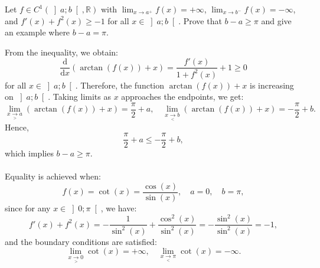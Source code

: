 \begin{problem}
    Let \( f \in C^1\left( \left]a;b\right[, \mathbb{R} \right) \) with \( \lim_{x \to a^+} f\left(x\right) = +\infty \), \( \lim_{x \to b^-} f\left(x\right) = -\infty \), and \( f'\left(x\right) + f^2\left(x\right) \geq -1 \) for all \( x \in \left]a;b\right[ \). Prove that \( b - a \geq \pi \) and give an example where \( b - a = \pi \).
\end{problem}
\begin{solution}
    From the inequality, we obtain:
    \[
        \frac{\mathrm{d}}{\mathrm{d}x} \left( \arctan\left(f\left(x\right)\right) + x \right) = \frac{f'\left(x\right)}{1 + f^2\left(x\right)} + 1 \geq 0
    \]
    for all \( x \in \left]a;b\right[ \). Therefore, the function \( \arctan\left(f\left(x\right)\right) + x \) is increasing on \( \left]a;b\right[ \). Taking limits as \( x \) approaches the endpoints, we get:
    \[
        \lim_{x\underset{>}{\to} a} \left( \arctan\left(f\left(x\right)\right) + x \right) = \frac{\pi}{2} + a, \quad \lim_{x\underset{<}{\to} b} \left( \arctan\left(f\left(x\right)\right) + x \right) = -\frac{\pi}{2} + b.
    \]
    Hence,
    \[
        \frac{\pi}{2} + a \leq -\frac{\pi}{2} + b,
    \]
    which implies \( b - a \geq \pi \).
    \\\\
    Equality is achieved when:
    \[
        f\left(x\right) = \cot\left(x\right) = \frac{\cos\left(x\right)}{\sin\left(x\right)}, \quad a = 0, \quad b = \pi,
    \]
    since for any \( x \in \left]0;\pi\right[ \), we have:
    \[
        f'\left(x\right) + f^2\left(x\right) = -\frac{1}{\sin^2\left(x\right)} + \frac{\cos^2\left(x\right)}{\sin^2\left(x\right)} = -\frac{\sin^2\left(x\right)}{\sin^2\left(x\right)} = -1,
    \]
    and the boundary conditions are satisfied:
    \[
        \lim_{x \underset{>}{\to} 0} \cot\left(x\right) = +\infty, \quad \lim_{ x\underset{<}{\to} \pi} \cot\left(x\right) = -\infty.
    \]
\end{solution}
